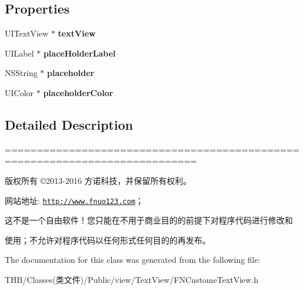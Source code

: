 \subsection*{Properties}
\begin{DoxyCompactItemize}
\item 
\mbox{\label{interface_f_n_custome_text_view_ae2f8d0a28313831980e1e9cc90b95e1d}} 
U\+I\+Text\+View $\ast$ {\bfseries text\+View}
\item 
\mbox{\label{interface_f_n_custome_text_view_a3ff5d339e791e35cfdb4646c49d1e460}} 
U\+I\+Label $\ast$ {\bfseries place\+Holder\+Label}
\item 
\mbox{\label{interface_f_n_custome_text_view_a9cac56dac9628d23b0d68f90fd20cb90}} 
N\+S\+String $\ast$ {\bfseries placeholder}
\item 
\mbox{\label{interface_f_n_custome_text_view_a6372b48e711e62602b838a009403fdc3}} 
U\+I\+Color $\ast$ {\bfseries placeholder\+Color}
\end{DoxyCompactItemize}


\subsection{Detailed Description}
============================================================================

版权所有 ©2013-\/2016 方诺科技，并保留所有权利。

网站地址\+: \href{http://www.fnuo123.com}{\tt http\+://www.\+fnuo123.\+com}； 



这不是一个自由软件！您只能在不用于商业目的的前提下对程序代码进行修改和

使用；不允许对程序代码以任何形式任何目的的再发布。 

 

The documentation for this class was generated from the following file\+:\begin{DoxyCompactItemize}
\item 
T\+H\+B/\+Classes(类文件)/\+Public/view/\+Text\+View/F\+N\+Custome\+Text\+View.\+h\end{DoxyCompactItemize}
